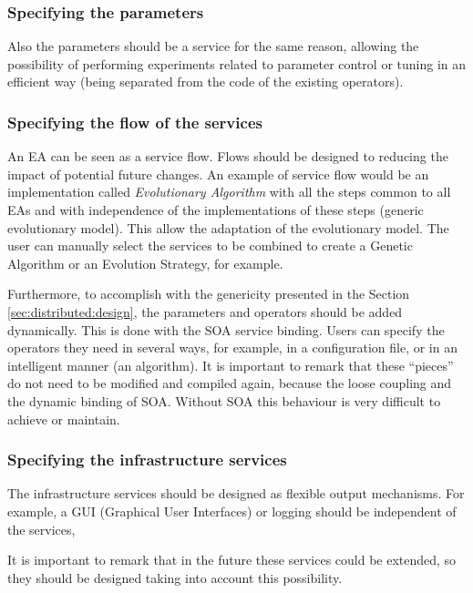 \subsubsection{Specifying the parameters}
Also the parameters should be
a service for the same reason, allowing the possibility of performing
experiments related to  parameter control or tuning \cite{ParameterControlEiben07} in an efficient way
(being separated from the code of the existing operators). 

\subsubsection{Specifying the flow of the services}

An EA can be seen as a service flow. Flows should be designed to reducing the impact of potential future changes. An example of service flow would be an implementation called {\em Evolutionary Algorithm} with all the steps common to all EAs and with independence of the implementations of these steps (generic evolutionary model). This allow the adaptation of the evolutionary model. The user can manually
  select the services to be combined to create a Genetic Algorithm or
  an Evolution Strategy, for example.  

  Furthermore, to accomplish with the genericity presented in the Section \ref{sec:distributed:design}, the parameters and operators should be added dynamically. This is done with the SOA service binding. Users can specify the operators they need in several ways, for example, in a configuration file, or in an intelligent manner (an algorithm). It is important to remark that these ``pieces'' do not need to be modified and compiled again, because the loose coupling and the dynamic binding of SOA. Without SOA this behaviour is very difficult to achieve or maintain.

\subsubsection{Specifying the infrastructure services}
The infrastructure services should be designed as flexible output mechanisms. For example, a GUI (Graphical User Interfaces) or logging should be independent of the services,  %



It is important to remark that in the future these services could be extended, so they should be designed taking into account this possibility.

